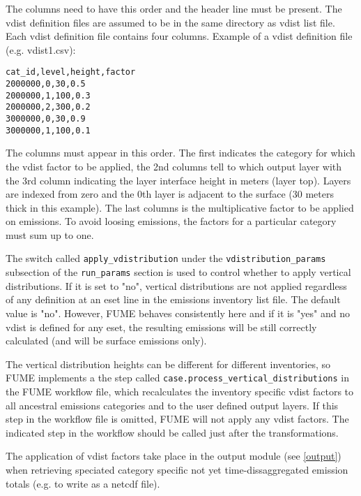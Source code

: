 \documentclass[a4paper,11pt]{article}
\begin{document}
The columns need to have this order and the header line must be present. The vdist definition files are assumed to be in the same directory as vdist list file. Each vdist definition file contains four columns. Example of a vdist definition file (e.g. vdist1.csv):

\begin{verbatim}
cat_id,level,height,factor
2000000,0,30,0.5
2000000,1,100,0.3
2000000,2,300,0.2
3000000,0,30,0.9
3000000,1,100,0.1
\end{verbatim}

The columns must appear in this order. The first indicates the category for which the vdist factor to be applied, the 2nd columns tell to which output layer with the 3rd column indicating the layer interface height in meters (layer top). Layers are indexed from zero and the 0th layer is adjacent to the surface (30 meters thick in this example). The last columns is the multiplicative factor to be applied on emissions. To avoid loosing emissions, the factors for a particular category must sum up to one.

The switch called \verb|apply_vdistribution| under the  \verb|vdistribution_params| subsection of the \verb|run_params| section is used to control whether to apply vertical distributions. If it is set to "no", vertical distributions are not applied regardless of any definition at an eset line in the emissions inventory list file. The default value is "no". However, FUME behaves consistently here and if it is "yes" and no vdist is defined for any eset, the resulting emissions will be still correctly calculated (and will be surface emissions only).

The vertical distribution heights can be different for different inventories, so FUME implements a the step called \verb|case.process_vertical_distributions| in the FUME workflow file, which recalculates the inventory specific vdist factors to all ancestral emissions categories and to the user defined output layers. If this step in the workflow file is omitted, FUME will not apply any vdist factors. The indicated step in the workflow should be called just after the transformations.

The application of vdist factors take place in the output module (see \ref{output}) when retrieving speciated category specific not yet time-dissaggregated emission totals (e.g. to write as a netcdf file). 
\end{document}
